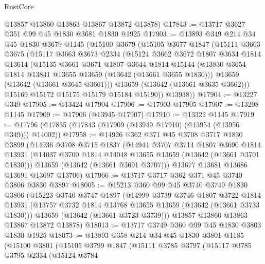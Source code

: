 \begin{lexlean}{RustCore}
\begin{coremodule}
      @13857
      @13860
      @13863
      @13867
      @13872
      @13878)
@17843 := @13717 @3627 @351 @99 @45 @1830 @3681 @1830 @1925
@17903 := @13893
    @349
    @214
    @34
    @45
    @1830
    @3679
    @1145
    (@15100
      @3679
      (@15105
        @3677
        @1847
        (@15111
          @3663
          @3675
          (@15117
            @3663
            @3673
            @2334
            (@15124
              @3662
              @3672
              @1807
              @3634
              @1814
              @13614
              (@15135
                @3661
                @3671
                @1807
                @3644
                @1814
                @15144
                (@13830 @3654 @1814 @13841 @13655 @13659 (@13642 (@13661 @3655 @1830)))
                @13659
                (@13642 (@13661 @3645 @3661)))
              @13659
              (@13642 (@13661 @3635 @3662)))
            @15169
            @15172
            @15175
            @15179
            @15184
            @15190))
        @13938))
@17904 := @13227 @349
@17905 := @13424 @17904
@17906 := @17903 @17905
@17907 := @13298 @1145
@17909 := @17906 (@13945 @17907)
@17910 := @13322 @1145
@17919 := @17796 (@17835 (@17843 (@17909 (@13949 @17910) (@13954 (@13956 @349))) @14002))
@17958 := @14926
    @362
    @371
    @45
    @3708
    @3717
    @1830
    @3899
    (@14936
      @3708
      @3715
      @1837
      (@14944
        @3707
        @3714
        @1807
        @3690
        @1814
        @13931
        (@14037 @3700 @1814 @14048 @13655 @13659 (@13642 (@13661 @3701 @1830)))
        @13659
        (@13642 (@13661 @3691 @3707)))
      @13677
      @13681
      @13686
      @13691
      @13697
      @13706)
@17966 := @13717 @3717 @362 @371 @45 @3740 @3806 @3830 @3897
@18005 := @15213
    @360
    @99
    @45
    @3740
    @3749
    @1830
    @3806
    (@15223
      @3740
      @3747
      @1897
      (@14999
        @3739
        @3746
        @1807
        @3722
        @1814
        @13931
        (@13757 @3732 @1814 @13768 @13655 @13659 (@13642 (@13661 @3733 @1830)))
        @13659
        (@13642 (@13661 @3723 @3739)))
      @13857
      @13860
      @13863
      @13867
      @13872
      @13878)
@18013 := @13717 @3749 @360 @99 @45 @1830 @3803 @1830 @1925
@18073 := @13893
    @358
    @214
    @34
    @45
    @1830
    @3801
    @1185
    (@15100
      @3801
      (@15105
        @3799
        @1847
        (@15111
          @3785
          @3797
          (@15117
            @3785
            @3795
            @2334
            (@15124
              @3784

\end{coremodule}
\end{lexlean}
